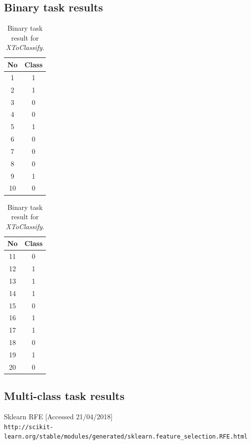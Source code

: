 \documentclass[11pt]{article}
\begin{document}
		\subsection{Binary task results}
		\begin{center}
		  	\begin{table}[h]
		  		\small

		  	\centering

			\begin{tabular}[b]{| c | c|} 
				\hline
				No & Class \\
				\hline
				1 & 1 \\ 2 & 1 \\ 3 & 0 \\ 4 & 0 \\ 5 & 1 \\ 6 & 0 \\ 7 & 0 \\ 8 & 0 \\ 9 & 1 \\ 10 & 0 \\
				\hline
			\end{tabular}
			\begin{tabular}[b]{| c | c|} 
				\hline
				No & Class \\
				\hline
				11 & 0 \\ 12 & 1 \\ 13 & 1 \\ 14 & 1 \\ 15 & 0 \\ 16 & 1 \\ 17 & 1 \\ 18 & 0 \\ 19 & 1 \\ 20 & 0 \\
				\hline
			\end{tabular}
			\caption{Binary task result for \textit{XToClassify}.}
			\label{tbl:final_binary}
			\end{table}
		\end{center}
		\subsection{Multi-class task results}




	\clearpage

	\begin{thebibliography}{9}

		Sklearn RFE [Accessed 21/04/2018]
		\\\texttt{http://scikit-learn.org/stable/modules/generated/sklearn.feature\_selection.RFE.html}

	\end{thebibliography}
\end{document}
